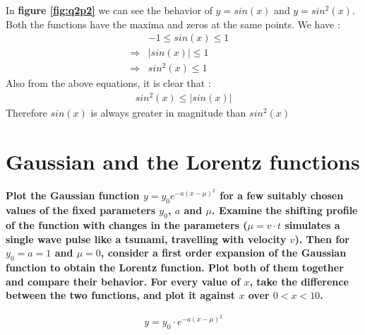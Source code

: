 \documentclass[12]{article}
\begin{document}
    In \textbf{figure \ref{fig:q2p2}} we can see the behavior of $y = sin(x)$ and $y = sin^2(x)$. Both the functions have the maxima and zeros at the same points. We have :
    \begin{eqnarray}
        &-1\leq sin(x)\leq1&\nonumber\\ 
        \Longrightarrow &\left|sin(x)\right|\leq1 \nonumber\\
        \Longrightarrow &sin^2(x)\leq1 \nonumber
    \end{eqnarray}
    Also from the above equations, it is clear that :
    \begin{eqnarray}
        sin^2(x)\leq\left|sin(x)\right| \nonumber
    \end{eqnarray}
    Therefore $sin(x)$ is always greater in magnitude than $sin^2(x)$
    \newpage
    
    \section{Gaussian and the Lorentz functions}
    \textbf{Plot the Gaussian function $y = y_0e^{-a(x-\mu)^2}$ for a few suitably chosen values of the fixed parameters $y_0$, $a$ and $\mu$. Examine the shifting profile of the function with changes in the parameters ($\mu = v\cdot t$ simulates a single wave pulse like a tsunami, travelling with velocity $v$). Then for $y_0 = a = 1$ and $\mu = 0$, consider a first order expansion of the Gaussian function to obtain the Lorentz function. Plot both of them together and compare their behavior. For every value of $x$, take the difference between the two functions, and plot it against $x$ over $0<x<10$.}
    
    \begin{eqnarray}
        y = y_0\cdot e^{-a(x-\mu)^2} \nonumber
    \end{eqnarray}
    
\end{document}

